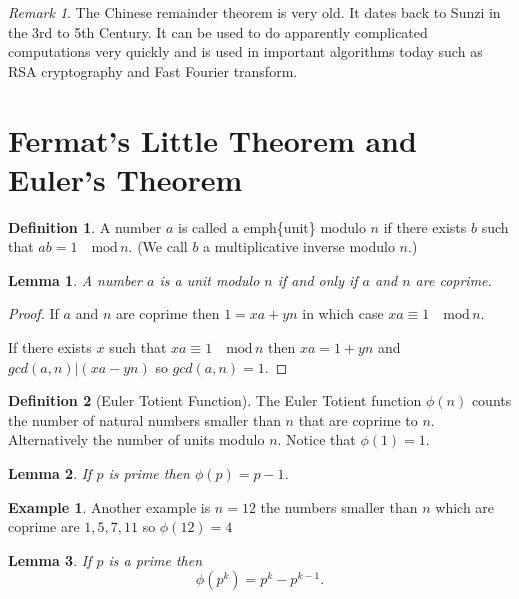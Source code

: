 \documentclass[
]{book}
\newtheorem{lemma}{Lemma}[chapter]
\theoremstyle{definition}
\newtheorem{definition}{Definition}[chapter]
\theoremstyle{definition}
\newtheorem{example}{Example}[chapter]
\theoremstyle{definition}
\theoremstyle{definition}
\theoremstyle{remark}
\newtheorem*{remark}{Remark}
\begin{document}
\begin{remark}
The Chinese remainder theorem is very old. It dates back to Sunzi in the 3rd to 5th Century. It can be used to do apparently complicated computations very quickly and is used in important algorithms today such as RSA cryptography and Fast Fourier transform.
\end{remark}

\section{Fermat's Little Theorem and Euler's Theorem}\label{fermats-little-theorem-and-eulers-theorem}

\begin{definition}
A number \(a\) is called a emph\{unit\} modulo \(n\) if there exists \(b\) such that \(ab = 1 \quad \mbox{mod} \, n\). (We call \(b\) a multiplicative inverse modulo \(n\).)
\end{definition}

\begin{lemma}
A number \(a\) is a unit modulo \(n\) if and only if \(a\) and \(n\) are coprime.
\end{lemma}

\begin{proof}
If \(a\) and \(n\) are coprime then \(1 = xa + yn\) in which case \(xa\equiv 1 \quad \mbox{mod} \, n\).

If there exists \(x\) such that \(xa \equiv 1 \quad \mbox{mod} \, n\) then \(x a = 1 + y n\) and \(gcd(a,n) | (xa-yn)\) so \(gcd(a,n) = 1\).
\end{proof}

\begin{definition}[Euler Totient Function]
The Euler Totient function \(\phi(n)\) counts the number of natural numbers smaller than \(n\) that are coprime to \(n\). Alternatively the number of units modulo \(n\). Notice that \(\phi(1)=1\).
\end{definition}

\begin{lemma}
If \(p\) is prime then \(\phi(p) = p-1\).
\end{lemma}

\begin{example}
Another example is \(n=12\) the numbers smaller than \(n\) which are coprime are \(1,5,7,11\) so \(\phi(12)=4\)
\end{example}

\begin{lemma}
If \(p\) is a prime then
\[ \phi(p^k) = p^k - p^{k-1}. \]
\end{lemma}
\end{document}
